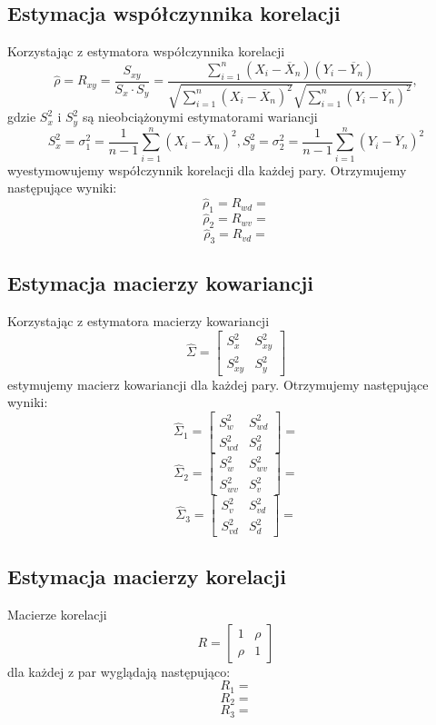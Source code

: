\documentclass[a4paper,11pt]{article}
\begin{document}
\subsection{Estymacja współczynnika korelacji}
Korzystając z estymatora współczynnika korelacji
$$\hat{\rho}=R_{xy}=\frac{S_{xy}}{S_x\cdot S_y}=\frac{\sum_{i=1}^{n}(X_i-\overline{X}_n)(Y_i-\overline{Y}_n)}{\sqrt{\sum_{i=1}^{n}(X_i-\overline{X}_n)^{2}}\sqrt{\sum_{i=1}^{n}(Y_i-\overline{Y}_n)^{2}}},$$
gdzie $S_x^{2}$ i $S_y^{2}$ są nieobciążonymi estymatorami wariancji
$$S^2_x=\sigma_1^2=\frac{1}{n-1}\sum_{i=1}^{n}(X_i-\overline{X}_n)^2, S^2_y=\sigma_2^2=\frac{1}{n-1}\sum_{i=1}^{n}(Y_i-\overline{Y}_n)^2$$ 
wyestymowujemy współczynnik korelacji dla każdej pary. Otrzymujemy następujące wyniki:
$$\hat{\rho}_1=R_{wd}=$$
$$\hat{\rho}_2=R_{wv}=$$
$$\hat{\rho}_3=R_{vd}=$$


\subsection{Estymacja macierzy kowariancji}
Korzystając z estymatora macierzy kowariancji
$$
\hat{\Sigma}=
\begin{bmatrix}
    S^2_x & S^2_{xy} \\
    S^2_{xy} & S^2_y
\end{bmatrix}
$$
estymujemy macierz kowariancji dla każdej pary. Otrzymujemy następujące wyniki:
$$
\hat{\Sigma}_1=
\begin{bmatrix}
    S^2_w & S^2_{wd} \\
    S^2_{wd} & S^2_d
\end{bmatrix}
=
$$
$$
\hat{\Sigma}_2=
\begin{bmatrix}
    S^2_w & S^2_{wv} \\
    S^2_{wv} & S^2_v
\end{bmatrix}
=
$$
$$
\hat{\Sigma}_3=
\begin{bmatrix}
    S^2_v & S^2_{vd} \\
    S^2_{vd} & S^2_d
\end{bmatrix}
=
$$


\subsection{Estymacja macierzy korelacji}
Macierze korelacji
$$R=
\begin{bmatrix}
    1 & \rho \\
    \rho & 1 
\end{bmatrix}$$
dla każdej z par wyglądają następująco:
$$R_1=$$
$$R_2=$$
$$R_3=$$
\end{document}
